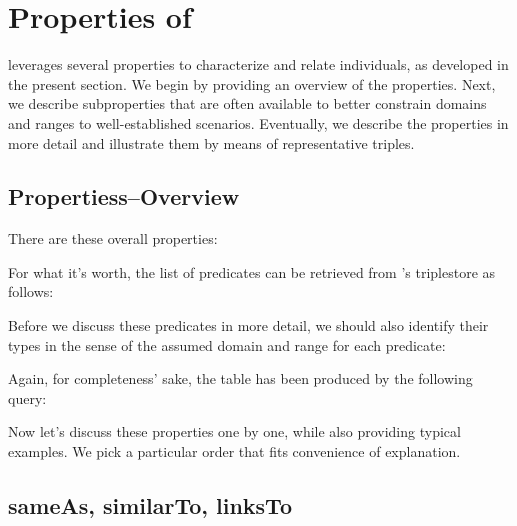 
\section{Properties of \solasote}
\label{S:properties}

\solatsote{} leverages several properties to characterize and relate
individuals, as developed in the present section.  We begin by
providing an overview of the properties. Next, we describe
subproperties that are often available to better constrain domains and
ranges to well-established scenarios. Eventually, we describe the
properties in more detail and illustrate them by means of
representative triples.


\subsection{Propertiess--Overview}

There are these overall properties:


\noindent
For what it's worth, the list of predicates can be retrieved from
\solasote's triplestore as follows:


\noindent
Before we discuss these predicates in more detail, we should also
identify their types in the sense of the assumed domain and range for
each predicate:


\noindent
Again, for completeness' sake, the table has been produced by the
following query:


\noindent
Now let's discuss these properties one by one, while also providing
typical examples. We pick a particular order that fits convenience of
explanation.


\subsection{sameAs, similarTo, linksTo} 
\label{S:sameAs}
\label{S:similarTo}
\label{S:linksTo}
 
